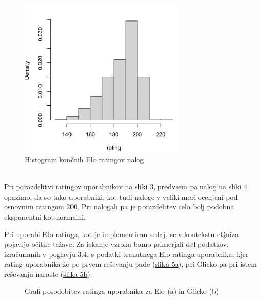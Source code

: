 \documentclass{IEEEtran}
\begin{document}
\begin{figure}[h!]
    \includegraphics[width=8cm]{EloExercisePrev}
    \caption{Histogram končnih Elo ratingov nalog}%
    \label{fig:eloPrevE}%
\end{figure}
\hfill
\\
\newpage
Pri porazdelitvi ratingov uporabnikov na sliki \hyperref[fig:eloPrevU]{3}, predvsem pa nalog na sliki \hyperref[fig:eloPrevE]{4} opazimo, da so tako uporabniki, kot tudi naloge v veliki meri ocenjeni pod osnovnim ratingom $200$. Pri nalogah pa je porazdelitev celo bolj podobna eksponentni
kot normalni.

\newpage
Pri uporabi Elo ratinga, kot je implementiran sedaj, se v kontekstu eQuiza pojavijo očitne težave. Za iskanje vzroka bomo primerjali del podatkov, 
izračunanih v \hyperref[sec:glicko]{poglavju 3.4}, s podatki tranutnega Elo ratinga uporabnika, kjer rating uporabnika že po prvem reševanju pade 
(\hyperref[fig:elovsglicko]{slika 5a}), pri Glicko pa pri istem reševanju naraste (\hyperref[fig:elovsglicko]{slika 5b}).

\begin{figure}%
    \caption{Grafi posodobitev ratinga uporabnika za Elo (a) in Glicko (b)}%
    \label{fig:elovsglicko}%
\end{figure}
\end{document}
